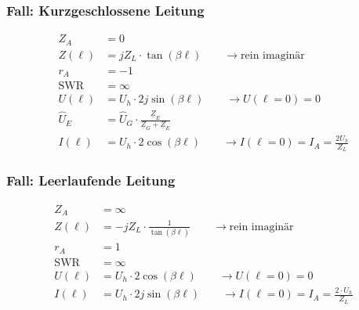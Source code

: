 \subsubsection{Fall: Kurzgeschlossene Leitung}
\begin{align*}
    Z_A          & = 0                                                                                         \\
    Z(\ell)         & = j Z_L\cdot\tan(\beta \ell)        \qquad\rightarrow\text{rein imaginär}                      \\
    r_A          & = -1                                                                                        \\
    \mathrm{SWR} & = \infty                                                                                    \\
    U(\ell)         & = U_h\cdot 2j\sin(\beta \ell)    \qquad\rightarrow U(\ell=0)=0                                    \\
    \hat{U}_E    & = \hat{U}_{G}\cdot\frac{\underline{Z}_E}{\underline{Z}_{G}+\underline{Z}_E} \\
    I(\ell)         & = U_h\cdot 2\cos(\beta \ell)    \qquad\rightarrow I(\ell=0)=I_A=\frac{2U_h}{Z_L}
\end{align*}

\subsubsection{Fall: Leerlaufende Leitung}
\begin{align*}
    Z_A          & = \infty                                                                         \\
    Z(\ell)         & = -jZ_L\cdot \frac{1}{\tan (\beta \ell)} \qquad\rightarrow\text{rein imaginär}                 \\
    r_A          & = 1                                                                              \\
    \mathrm{SWR} & = \infty                                                                         \\
    U(\ell)         & = U_h\cdot 2\cos(\beta \ell) \qquad\rightarrow U(\ell=0)=0                             \\
    I(\ell)         & = U_h\cdot 2j\sin(\beta \ell) \qquad\rightarrow I(\ell=0)=I_A = \frac{2\cdot U_h}{Z_L}
\end{align*}

